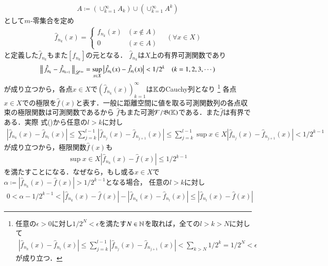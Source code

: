 \begin{prf}
\begin{description}
			\begin{align}
				A \coloneqq \left( \cup_{k=1}^{\infty} A_k \right) \cup \left( \cup_{k=1}^{\infty} A^k \right)
			\end{align}
			として$m$-零集合を定め
			\begin{align}
				\hat{f}_{n_k}(x) =
				\begin{cases}
					f_{n_k}(x) & (x \notin A) \\
					0 & (x \in A)
				\end{cases}
				\quad (\forall x \in X)
			\end{align}
			と定義した$\hat{f}_{n_k}$もまた$[f_{n_k}]$の元となる．
			$\hat{f}_{n_k}$は$X$上の有界可測関数であり
			\begin{align}
				\left\|\, \hat{f}_{n_k} - \hat{f}_{n_{k+1}}\, \right\|_{\mathscr{L}^\infty} = \operatorname*{sup}_{x \in X} \left|\hat{f}_{n_k}(x) - \hat{f}_{n_{l}}(x)\right| < 1/2^k \quad (k=1,2,3,\cdots) 
				\label{ineq:Lp_banach_1}
			\end{align}
			が成り立つから，各点$x \in X$で$\left( \hat{f}_{n_k}(x) \right)_{k=1}^{\infty}$は$\mathbb{K}$のCauchy列となり
			\footnote{
				任意の$\epsilon > 0$に対し$1/2^N < \epsilon$を満たす$N \in \mathbb{N}$を取れば，全ての$l > k > N$に対して
				\begin{align}
					\left|\hat{f}_{n_k}(x) - \hat{f}_{n_{l}}(x)\right| \leq \sum_{j=k}^{l-1}\left|\hat{f}_{n_j}(x) - \hat{f}_{n_{j+1}}(x)\right| < \sum_{k > N} 1/2^k = 1/2^N < \epsilon
				\end{align}
				が成り立つ．
			}
			各点$x \in X$での極限を$\hat{f}(x)$と表す．一般に距離空間に値を取る可測関数列の各点収束の極限関数は可測関数であるから
			$\hat{f}$もまた可測$\mathcal{F}/\mathfrak{B}(\mathbb{K})$である．また$\hat{f}$は有界である．実際
			式()から任意の$l > k$に対し
			\begin{align}
				|\hat{f}_{n_k}(x) - \hat{f}_{n_l}(x)| \leq \sum_{j=k}^{l-1} |\hat{f}_{n_{j}}(x) - \hat{f}_{n_{j+1}}(x)| 
				\leq \sum_{j=k}^{l-1} \sup{x \in X}{|\hat{f}_{n_j}(x) - \hat{f}_{n_{j+1}}(x)|} < 1/2^{k-1}
			\end{align}
			が成り立つから，極限関数$\hat{f}(x)$も
			\begin{align}
				\sup{x \in X}{|\hat{f}_{n_k}(x) - \hat{f}(x)|} \leq 1/2^{k-1} \label{ineq:Lp_banach_3}
			\end{align}
			を満たすことになる．なぜなら，もし或る$x \in X$で$\alpha \coloneqq |\hat{f}_{n_k}(x) - \hat{f}(x)| > 1/2^{k-1}$となる場合，
			任意の$l > k$に対し
			\begin{align}
				0 < \alpha - 1/2^{k-1} < |\hat{f}_{n_k}(x) - \hat{f}(x)| - |\hat{f}_{n_k}(x) - \hat{f}_{n_l}(x)| \leq |\hat{f}_{n_l}(x) - \hat{f}(x)|

\end{align}
\end{description}
\end{prf}
